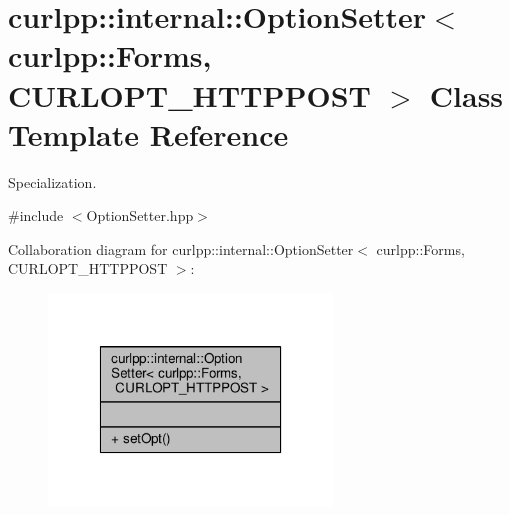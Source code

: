 \hypertarget{classcurlpp_1_1internal_1_1OptionSetter_3_01curlpp_1_1Forms_00_01CURLOPT__HTTPPOST_01_4}{\section{curlpp\-:\-:internal\-:\-:Option\-Setter$<$ curlpp\-:\-:Forms, C\-U\-R\-L\-O\-P\-T\-\_\-\-H\-T\-T\-P\-P\-O\-S\-T $>$ Class Template Reference}
\label{classcurlpp_1_1internal_1_1OptionSetter_3_01curlpp_1_1Forms_00_01CURLOPT__HTTPPOST_01_4}
}


Specialization.  




{\ttfamily \#include $<$Option\-Setter.\-hpp$>$}



Collaboration diagram for curlpp\-:\-:internal\-:\-:Option\-Setter$<$ curlpp\-:\-:Forms, C\-U\-R\-L\-O\-P\-T\-\_\-\-H\-T\-T\-P\-P\-O\-S\-T $>$\-:
\nopagebreak
\begin{figure}[H]
\begin{center}
\leavevmode
\includegraphics[width=214pt]{classcurlpp_1_1internal_1_1OptionSetter_3_01curlpp_1_1Forms_00_01CURLOPT__HTTPPOST_01_4__coll__graph}
\end{center}
\end{figure}
